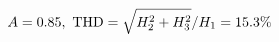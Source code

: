 \documentclass[preview]{standalone}
\begin{document}
\begin{align*}
\special{dvisvgm:raw <g id='unique000'>}A=0.85,\ \text{THD}=\sqrt{H_2^2+H_3^2}/H_1=15.3\%\special{dvisvgm:raw </g>}
\end{align*}
\end{document}
